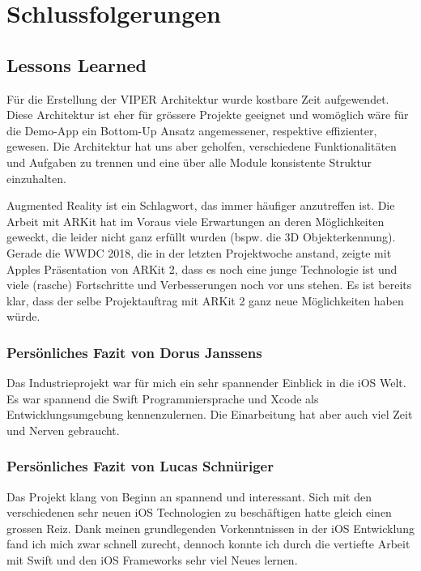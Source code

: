 \section{Schlussfolgerungen}

\subsection{Lessons Learned}

Für die Erstellung der VIPER Architektur wurde kostbare Zeit aufgewendet.
Diese Architektur ist eher für grössere Projekte geeignet und womöglich wäre für die Demo-App ein Bottom-Up Ansatz angemessener, respektive effizienter, gewesen.
Die Architektur hat uns aber geholfen, verschiedene Funktionalitäten und Aufgaben zu trennen und eine über alle Module konsistente Struktur einzuhalten.

Augmented Reality ist ein Schlagwort, das immer häufiger anzutreffen ist.
Die Arbeit mit ARKit hat im Voraus viele Erwartungen an deren Möglichkeiten geweckt, die leider nicht ganz erfüllt wurden (bspw. die 3D Objekterkennung).
Gerade die WWDC 2018, die in der letzten Projektwoche anstand, zeigte mit Apples Präsentation von ARKit 2, dass es noch eine junge Technologie ist und viele (rasche) Fortschritte und Verbesserungen noch vor uns stehen.
Es ist bereits klar, dass der selbe Projektauftrag mit ARKit 2 ganz neue Möglichkeiten haben würde.

\subsubsection{Persönliches Fazit von Dorus Janssens}
Das Industrieprojekt war für mich ein sehr spannender Einblick in die iOS Welt. Es war spannend die Swift Programmiersprache und Xcode als Entwicklungsumgebung kennenzulernen. Die Einarbeitung hat aber auch viel Zeit und Nerven gebraucht. 

\subsubsection{Persönliches Fazit von Lucas Schnüriger}

Das Projekt klang von Beginn an spannend und interessant.
Sich mit den verschiedenen sehr neuen iOS Technologien zu beschäftigen hatte gleich einen grossen Reiz.
Dank meinen grundlegenden Vorkenntnissen in der iOS Entwicklung fand ich mich zwar schnell zurecht, dennoch konnte ich durch die vertiefte Arbeit mit Swift und den iOS Frameworks sehr viel Neues lernen.

